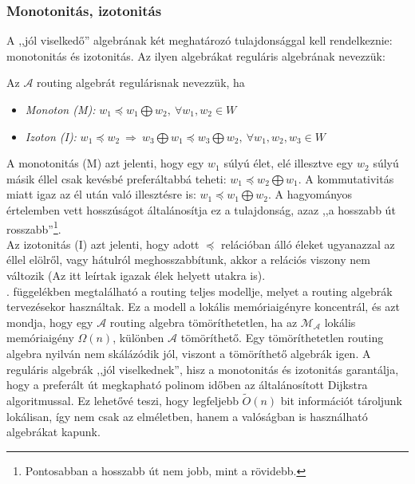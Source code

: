     \subsubsection{Monotonitás, izotonitás}\label{jol_viselkedo}
    A ,,jól viselkedő'' algebrának két meghatározó tulajdonsággal kell rendelkeznie: monotonitás és izotonitás. Az ilyen algebrákat reguláris algebrának nevezzük:

    \begin{definition} 
      Az $\mathcal{A}$ routing algebrát regulárisnak nevezzük, ha
      \begin{itemize}
      \item \emph{ Monoton (M):} $w_{1} \preceq w_{1} \bigoplus w_{2}, ~\forall w_{1}, w_{2} \in W$
      \item \emph{ Izoton (I):} $w_{1} \preceq w_{2}~\Rightarrow~w_{3} \bigoplus w_{1} \preceq w_{3} \bigoplus w_{2},~\forall w_{1}, w_{2}, w_{3} \in W$
      \end{itemize}
    \end{definition}

    A monotonitás (M) azt jelenti, hogy egy $w_1$ súlyú élet, elé illesztve egy $w_2$ súlyú másik éllel csak kevésbé preferáltabbá teheti: $w_{1} \preceq w_{2} \bigoplus w_{1}$. A kommutativitás miatt igaz az él után való illesztésre is: $w_{1} \preceq w_{1} \bigoplus w_{2}$. A hagyományos értelemben vett hosszúságot általánosítja ez a tulajdonság, azaz ,,a hosszabb út rosszabb''\footnote{Pontosabban a hosszabb út nem jobb, mint a rövidebb.}.\\
    Az izotonitás (I) azt jelenti, hogy adott $\preceq$ relációban álló éleket ugyanazzal az éllel elölről, vagy hátulról meghosszabbítunk, akkor a relációs viszony nem változik (Az itt leírtak igazak élek helyett utakra is).\\

    . függelékben megtalálható a routing teljes modellje, melyet a routing algebrák tervezésekor használtak\cite{Sobrinho_Network_routing}. Ez a modell a lokális memóriaigényre koncentrál, és azt mondja, hogy egy $\mathcal{A}$ routing algebra tömöríthetetlen, ha az $\mathcal{M_{\mathcal{A}}}$ lokális memóriaigény $\Omega(n)$, különben $\mathcal{A}$ tömöríthető. Egy tömöríthetetlen routing algebra nyilván nem skálázódik jól, viszont a tömöríthető algebrák igen. A reguláris algebrák ,,jól viselkednek'', hisz a monotonitás és izotonitás garantálja, hogy a preferált út megkapható polinom időben az általánosított Dijkstra algoritmussal. Ez lehetővé teszi, hogy legfeljebb $\tilde{O}(n)$ bit információt tároljunk lokálisan, így nem csak az elméletben, hanem a valóságban is használható algebrákat kapunk\cite{Sobrinho_Network_routing, Sobrinho_Metarouting}.


